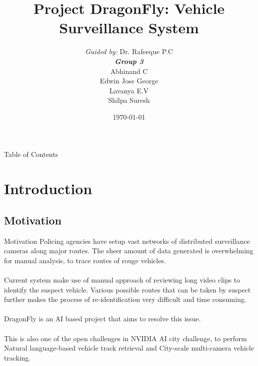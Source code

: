 \documentclass{beamer}
\title[DragonFly]{Project DragonFly: Vehicle Surveillance System}
\institute[GCEK-CSE]{Department of Computer Science and Engineering \\Government College of Engineering Kannur}
\author[Group 3]{
	{\small \textit{Guided by:}} Dr. Rafeeque P.C \\
	\medskip
	{\small \textbf{\textit{Group 3}}} \\
	Abhinand C \\ Edwin Jose George \\ Lavanya E.V \\ Shilpa Suresh
}
\date{\today}
\begin{document}
	

	\begin{frame}
	\titlepage
	\end{frame}

	\begin{frame}{Table of Contents}
	\tableofcontents
	\end{frame}



	\section{Introduction}
	\subsection{Motivation}
	\begin{frame}{Motivation}		
		Policing agencies have setup vast networks of distributed surveillance cameras along major routes. The sheer amount of data generated is overwhelming for manual analysis, to trace routes of rouge vehicles.\\~\\
		
		Current system make use of manual approach of reviewing long video
		clips to identify the suspect vehicle. Various possible routes that can
		be taken by suspect further makes the process of re-identification very
		difficult and time consuming.\\~\\		
		DragonFly is an AI based project that aims to resolve this  issue. \\~\\

		This is also one of the open challenges in NVIDIA AI city challenge, to perform Natural language-based vehicle track retrieval and City-scale multi-camera vehicle tracking.
		
	\end{frame}
\end{document}
